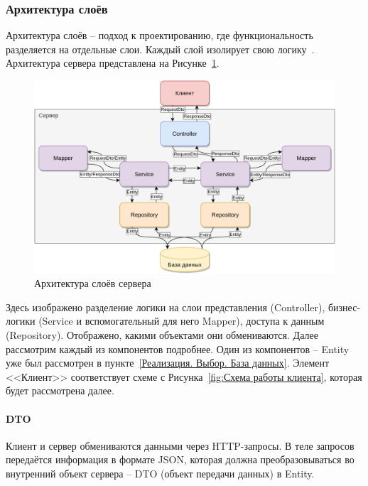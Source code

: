 \documentclass[a4paper,article]{article}
\begin{document}
\begin{sloppypar}
    \subsubsection{Архитектура слоёв}\label{Реализация. Сервер. Архитектура слоёв}

    Архитектура слоёв -- подход к проектированию, где функциональность разделяется на отдельные слои. Каждый слой изолирует свою логику~\cite{baeldungbook, springguide, cleanarch}. Архитектура сервера представлена на Рисунке~\ref{fig:Схема работы сервера}.

    \begin{figure}[h]
        \centering
        \includegraphics[width=0.9\linewidth]{Схема работы сервера.png}
        \caption{\centering Архитектура слоёв сервера}
        \label{fig:Схема работы сервера}
    \end{figure}

    Здесь изображено разделение логики на слои представления (Controller), бизнес-логики (Service и вспомогательный для него Mapper), доступа к данным (Repository). Отображено, какими объектами они обмениваются. Далее рассмотрим каждый из компонентов подробнее. Один из компонентов -- Entity уже был рассмотрен в пункте~\ref{Реализация. Выбор. База данных}. Элемент <<Клиент>> соответствует схеме с Рисунка~\ref{fig:Схема работы клиента}, которая будет рассмотрена далее.

    \paragraph{DTO}\label{Реализация. Сервер. DTO}

    Клиент и сервер обмениваются данными через HTTP-запросы. В теле запросов передаётся информация в формате JSON, которая должна преобразовываться во внутренний объект сервера -- DTO (объект передачи данных) в Entity.


\end{sloppypar}
\end{document}
